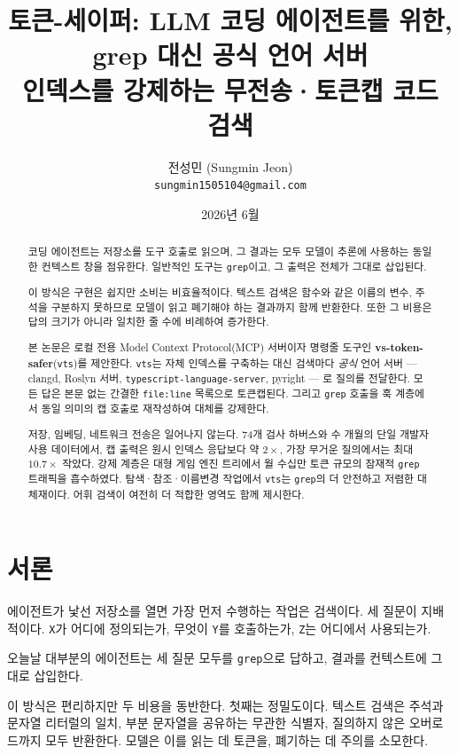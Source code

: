 \documentclass[11pt]{article}
\title{\textbf{토큰-세이퍼: LLM 코딩 에이전트를 위한, grep 대신 공식 언어 서버\\
인덱스를 강제하는 무전송·토큰캡 코드 검색}}
\author{
  전성민 (Sungmin Jeon)\\
  \texttt{sungmin1505104@gmail.com}
}
\date{2026년 6월}
\begin{document}
\maketitle

\begin{abstract}
코딩 에이전트는 저장소를 도구 호출로 읽으며, 그 결과는 모두 모델이 추론에 사용하는 동일한
컨텍스트 창을 점유한다. 일반적인 도구는 \texttt{grep}이고, 그 출력은 전체가 그대로 삽입된다.

이 방식은 구현은 쉽지만 소비는 비효율적이다. 텍스트 검색은 함수와 같은 이름의 변수, 주석을
구분하지 못하므로 모델이 읽고 폐기해야 하는 결과까지 함께 반환한다. 또한 그 비용은 답의
크기가 아니라 일치한 줄 수에 비례하여 증가한다.

본 논문은 로컬 전용 Model Context Protocol(MCP) 서버이자 명령줄 도구인
\textbf{vs-token-safer}(\texttt{vts})를 제안한다. \texttt{vts}는 자체 인덱스를 구축하는
대신 검색마다 \emph{공식} 언어 서버 --- clangd, Roslyn 서버,
\texttt{typescript-language-server}, pyright --- 로 질의를 전달한다. 모든 답은 본문 없는
간결한 \texttt{file:line} 목록으로 토큰캡된다. 그리고 \texttt{grep} 호출을 훅 계층에서 동일
의미의 캡 호출로 재작성하여 대체를 강제한다.

저장, 임베딩, 네트워크 전송은 일어나지 않는다. 74개 검사 하버스와 수 개월의 단일 개발자
사용 데이터에서, 캡 출력은 원시 인덱스 응답보다 약 $2\times$, 가장 무거운 질의에서는 최대
$10.7\times$ 작았다. 강제 계층은 대형 게임 엔진 트리에서 월 수십만 토큰 규모의 잠재적
\texttt{grep} 트래픽을 흡수하였다. 탐색·참조·이름변경 작업에서 \texttt{vts}는 \texttt{grep}의
더 안전하고 저렴한 대체재이다. 어휘 검색이 여전히 더 적합한 영역도 함께 제시한다.
\end{abstract}

\section{서론}
\label{sec:intro}

에이전트가 낯선 저장소를 열면 가장 먼저 수행하는 작업은 검색이다. 세 질문이 지배적이다.
\texttt{X}가 어디에 정의되는가, 무엇이 \texttt{Y}를 호출하는가, \texttt{Z}는 어디에서 사용되는가.

오늘날 대부분의 에이전트는 세 질문 모두를 \texttt{grep}으로 답하고, 결과를 컨텍스트에 그대로
삽입한다.

이 방식은 편리하지만 두 비용을 동반한다. 첫째는 정밀도이다. 텍스트 검색은 주석과 문자열
리터럴의 일치, 부분 문자열을 공유하는 무관한 식별자, 질의하지 않은 오버로드까지 모두 반환한다.
모델은 이를 읽는 데 토큰을, 폐기하는 데 주의를 소모한다.
\end{document}
